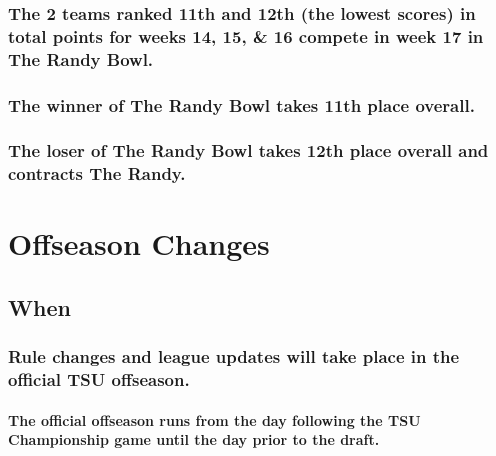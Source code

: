 \documentclass[
]{book}
\begin{document}
\hypertarget{the-2-teams-ranked-11th-and-12th-the-lowest-scores-in-total-points-for-weeks-14-15-16-compete-in-week-17-in-the-randy-bowl.}{%
\subsection{The 2 teams ranked 11th and 12th (the lowest scores) in total points for weeks 14, 15, \& 16 compete in week 17 in The Randy Bowl.}\label{the-2-teams-ranked-11th-and-12th-the-lowest-scores-in-total-points-for-weeks-14-15-16-compete-in-week-17-in-the-randy-bowl.}}

\hypertarget{the-winner-of-the-randy-bowl-takes-11th-place-overall.}{%
\subsection{The winner of The Randy Bowl takes 11th place overall.}\label{the-winner-of-the-randy-bowl-takes-11th-place-overall.}}

\hypertarget{the-loser-of-the-randy-bowl-takes-12th-place-overall-and-contracts-the-randy.}{%
\subsection{The loser of The Randy Bowl takes 12th place overall and contracts The Randy.}\label{the-loser-of-the-randy-bowl-takes-12th-place-overall-and-contracts-the-randy.}}

\hypertarget{offseason-changes}{%
\chapter{Offseason Changes}\label{offseason-changes}}

\hypertarget{when-1}{%
\section{When}\label{when-1}}

\hypertarget{rule-changes-and-league-updates-will-take-place-in-the-official-tsu-offseason.}{%
\subsection{Rule changes and league updates will take place in the official TSU offseason.}\label{rule-changes-and-league-updates-will-take-place-in-the-official-tsu-offseason.}}

\hypertarget{the-official-offseason-runs-from-the-day-following-the-tsu-championship-game-until-the-day-prior-to-the-draft.}{%
\subsubsection{The official offseason runs from the day following the TSU Championship game until the day prior to the draft.}\label{the-official-offseason-runs-from-the-day-following-the-tsu-championship-game-until-the-day-prior-to-the-draft.}}
\end{document}
